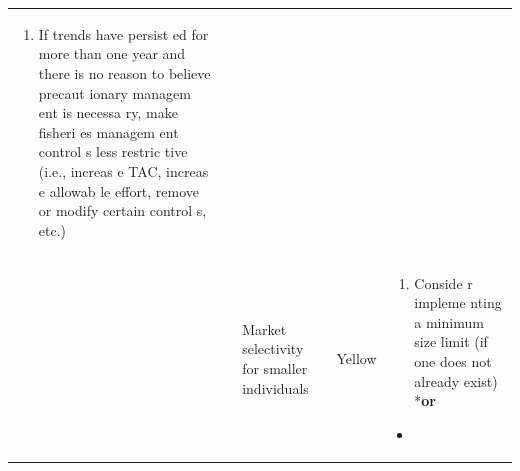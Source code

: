 \documentclass[]{book}
\providecommand{\tightlist}{%
  \setlength{\itemsep}{0pt}\setlength{\parskip}{0pt}}
\begin{document}
\begin{longtable}[]{@{}lllll@{}}
\begin{minipage}[t]{0.19\columnwidth}
\begin{enumerate}
\def\labelenumi{\arabic{enumi}.}
\setcounter{enumi}{1}
\tightlist
\item
  If trends have persist ed for more than one year and there is no
  reason to believe precaut ionary managem ent is necessa ry, make
  fisheri es managem ent control s less restric tive (i.e., increas e
  TAC, increas e allowab le effort, remove or modify certain control s,
  etc.)
\end{enumerate}\strut
\end{minipage}\tabularnewline
\begin{minipage}[t]{0.19\columnwidth}\raggedright\strut
\strut
\end{minipage} & \begin{minipage}[t]{0.19\columnwidth}\raggedright\strut
\strut
\end{minipage} & \begin{minipage}[t]{0.19\columnwidth}\raggedright\strut
Market selectivity for smaller individuals\strut
\end{minipage} & \begin{minipage}[t]{0.19\columnwidth}\raggedright\strut
Yellow\strut
\end{minipage} & \begin{minipage}[t]{0.19\columnwidth}\raggedright\strut
\begin{enumerate}
\def\labelenumi{\arabic{enumi}.}
\tightlist
\item
  Conside r impleme nting a minimum size limit (if one does not already
  exist) *\textbf{or}
\end{enumerate}

\begin{itemize}
\item
\end{itemize}


\end{minipage}
\end{longtable}
\end{document}
